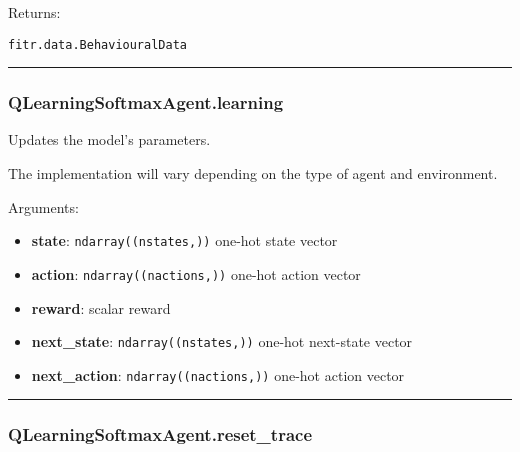 Returns:

\texttt{fitr.data.BehaviouralData}

\begin{center}\rule{0.5\linewidth}{\linethickness}\end{center}

\subsubsection{QLearningSoftmaxAgent.learning}\label{qlearningsoftmaxagent.learning}

\begin{Shaded}
\begin{Highlighting}[]
\end{Highlighting}
\end{Shaded}

Updates the model's parameters.

The implementation will vary depending on the type of agent and
environment.

Arguments:

\begin{itemize}
\tightlist
\item
  \textbf{state}: \texttt{ndarray((nstates,))} one-hot state vector
\item
  \textbf{action}: \texttt{ndarray((nactions,))} one-hot action vector
\item
  \textbf{reward}: scalar reward
\item
  \textbf{next\_state}: \texttt{ndarray((nstates,))} one-hot next-state
  vector
\item
  \textbf{next\_action}: \texttt{ndarray((nactions,))} one-hot action
  vector
\end{itemize}

\begin{center}\rule{0.5\linewidth}{\linethickness}\end{center}

\subsubsection{QLearningSoftmaxAgent.reset\_trace}\label{qlearningsoftmaxagent.reset_trace}

\begin{Shaded}
\begin{Highlighting}[]
\OperatorTok{=}\NormalTok{)}
\end{Highlighting}
\end{Shaded}

